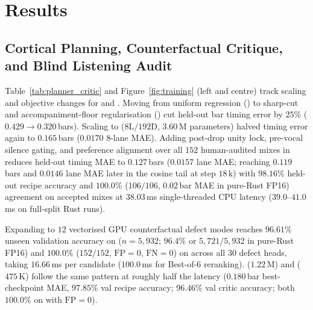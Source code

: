 \section{Results}
\label{sec:results}

\subsection{Cortical Planning, Counterfactual Critique, and Blind Listening Audit}
\label{sec:res_beat}

Table~\ref{tab:planner_critic} and Figure~\ref{fig:training} (left and centre) track scaling and objective changes for  and . Moving from uniform regression () to sharp-cut and accompaniment-floor regularisation () cut held-out bar timing error by $25\%$ ($0.429 \to 0.320$\,bars). Scaling to  ($8\text{L}/192\text{D}$, $3.60$\,M parameters) halved timing error again to $0.165$\,bars ($0.0170$ 8-lane MAE). Adding post-drop unity lock, pre-vocal silence gating, and preference alignment over all $152$ human-audited mixes in  reduces held-out timing MAE to $0.127$\,bars ($0.0157$ lane MAE; reaching $0.119$\,bars and $0.0146$ lane MAE later in the cosine tail at step $18$\,k) with $98.16\%$ held-out recipe accuracy and $100.0\%$ ($106/106$, $0.02$\,bar MAE in pure-Rust FP16) agreement on accepted mixes at $38.03$\,ms single-threaded CPU latency ($39.0$--$41.0$\,ms on full-split Rust runs).

Expanding  to $12$ vectorised GPU counterfactual defect modes reaches $96.61\%$ unseen validation accuracy on  ($n=5{,}932$; $96.4\%$ or $5{,}721/5{,}932$ in pure-Rust FP16) and $100.0\%$ ($152/152$, $\mathrm{FP}=0$, $\mathrm{FN}=0$) on  across all $30$ defect heads, taking $16.66$\,ms per candidate ($100.0$\,ms for Best-of-$6$ reranking).  ($1.22$\,M) and  ($475$\,K) follow the same pattern at roughly half the latency ($0.180$\,bar best-checkpoint MAE, $97.85\%$ val recipe accuracy; $96.46\%$ val critic accuracy; both $100.0\%$ on  with $\mathrm{FP}=0$).



